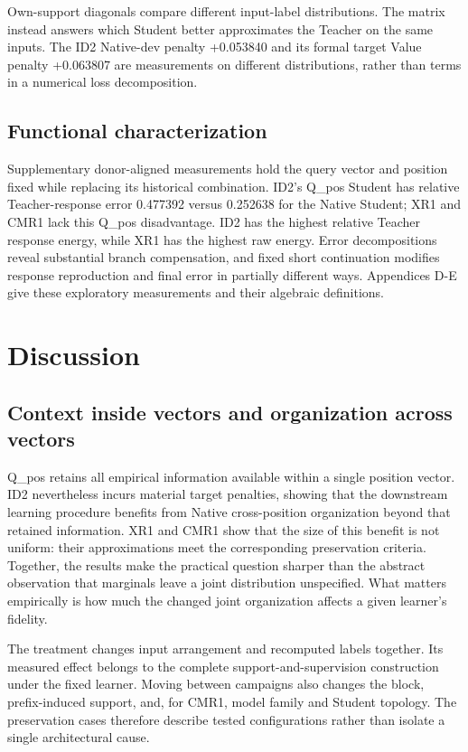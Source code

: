 Own-support diagonals compare different input-label distributions. The matrix instead answers which Student better approximates the Teacher on the same inputs. The ID2 Native-dev penalty +0.053840 and its formal target Value penalty +0.063807 are measurements on different distributions, rather than terms in a numerical loss decomposition.

\subsection{Functional characterization}\label{functional-characterization}

Supplementary donor-aligned measurements hold the query vector and position fixed while replacing its historical combination. ID2's Q\_pos Student has relative Teacher-response error 0.477392 versus 0.252638 for the Native Student; XR1 and CMR1 lack this Q\_pos disadvantage. ID2 has the highest relative Teacher response energy, while XR1 has the highest raw energy. Error decompositions reveal substantial branch compensation, and fixed short continuation modifies response reproduction and final error in partially different ways. Appendices D-E give these exploratory measurements and their algebraic definitions.

\section{Discussion}\label{discussion}

\subsection{Context inside vectors and organization across vectors}\label{context-inside-vectors-and-organization-across-vectors}

Q\_pos retains all empirical information available within a single position vector. ID2 nevertheless incurs material target penalties, showing that the downstream learning procedure benefits from Native cross-position organization beyond that retained information. XR1 and CMR1 show that the size of this benefit is not uniform: their approximations meet the corresponding preservation criteria. Together, the results make the practical question sharper than the abstract observation that marginals leave a joint distribution unspecified. What matters empirically is how much the changed joint organization affects a given learner's fidelity.

The treatment changes input arrangement and recomputed labels together. Its measured effect belongs to the complete support-and-supervision construction under the fixed learner. Moving between campaigns also changes the block, prefix-induced support, and, for CMR1, model family and Student topology. The preservation cases therefore describe tested configurations rather than isolate a single architectural cause.


